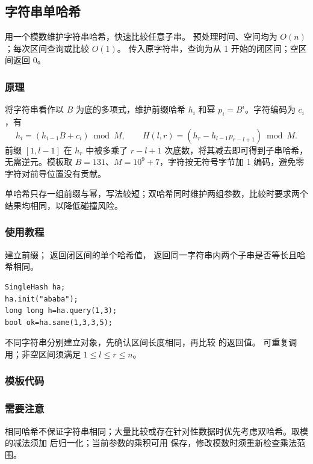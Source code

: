 \subsection{字符串单哈希}
\label{algo:string-hash-single}
\AlgorithmInfo
    {用一个模数维护字符串哈希，快速比较任意子串。}
    {预处理时间、空间均为 $O(n)$；每次区间查询或比较 $O(1)$。}
    {传入原字符串，查询为从 1 开始的闭区间；空区间返回 0。}
\subsubsection*{原理}
将字符串看作以 $B$ 为底的多项式，维护前缀哈希 $h_i$ 和幂 $p_i=B^i$。字符编码为 $c_i$，有
\[
    h_i=(h_{i-1}B+c_i)\bmod M,\qquad
    H(l,r)=(h_r-h_{l-1}p_{r-l+1})\bmod M.
\]
前缀 $[1,l-1]$ 在 $h_r$ 中被多乘了 $r-l+1$ 次底数，将其减去即可得到子串哈希，无需逆元。模板取 $B=131$、$M=10^9+7$，字符按无符号字节加 1 编码，避免零字符对前导位置没有贡献。

单哈希只存一组前缀与幂，写法较短；双哈希同时维护两组参数，比较时要求两个结果均相同，以降低碰撞风险。
\subsubsection*{使用教程}
 建立前缀； 返回闭区间的单个哈希值， 返回同一字符串内两个子串是否等长且哈希相同。
\begin{lstlisting}[style=mtycpp,numbers=none]
SingleHash ha;
ha.init("ababa");
long long h=ha.query(1,3);
bool ok=ha.same(1,3,3,5);
\end{lstlisting}
不同字符串分别建立对象，先确认区间长度相同，再比较  的返回值。 可重复调用；非空区间须满足 $1\le l\le r\le n$。
\subsubsection*{模板代码}
\subsubsection*{需要注意}
相同哈希不保证字符串相同；大量比较或存在针对性数据时优先考虑双哈希。取模的减法须加  后归一化；当前参数的乘积可用  保存，修改模数时须重新检查乘法范围。
